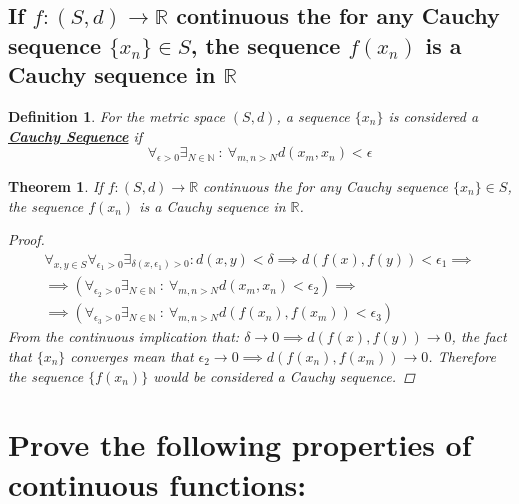 \documentclass[]{article}
\newcommand{\R}{\mathbb{R}}
\newcommand{\N}{\mathbb{N}}
\newcommand{\st}{\ : \ }
\newtheorem{definition}{Definition}
\newtheorem{theorem}{Theorem}
\begin{document}
\subsection{If $f: (S,d) \to \R$ continuous the for any Cauchy sequence $\{x_n\} \in S$, the sequence $f(x_n)$ is a Cauchy sequence in $\R$}
\begin{definition}
    For the metric space $(S,d)$, a sequence $\{x_n\}$ is considered a \textbf{\underline{Cauchy Sequence}} if 
    $$\forall_{\epsilon>0} \exists_{N\in\N} \st \forall_{m,n > N} d(x_m,x_n) < \epsilon$$
\end{definition}
\begin{theorem}
    If $f: (S,d) \to \R$ continuous the for any Cauchy sequence $\{x_n\} \in S$, the sequence $f(x_n)$ is a Cauchy sequence in $\R$.
    \begin{proof}
        \begin{align*}
            \forall_{x,y\in S} \forall_{\epsilon_1>0} \exists_{\delta(x,\epsilon_1)>0} : d(x,y) < \delta \implies d(f(x),f(y)) < \epsilon_1 \implies\\
            \implies(\forall_{\epsilon_2>0} \exists_{N\in\N} \st \forall_{m,n > N} d(x_m,x_n) < \epsilon_2)\implies\\
            \implies(\forall_{\epsilon_3>0} \exists_{N\in\N} \st \forall_{m,n > N} d(f(x_n),f(x_m)) < \epsilon_3)
        \end{align*}
        From the continuous implication that: $\delta \to 0 \implies d(f(x),f(y)) \to 0$, the fact that $\{x_n\}$ converges mean that $\epsilon_2 \to 0 \implies d(f(x_n),f(x_m)) \to 0$. Therefore the sequence $\{f(x_n)\}$ would be considered a Cauchy sequence. 
    \end{proof}
\end{theorem}




\newpage
\section{Prove the following properties of continuous functions:}

\end{document}
